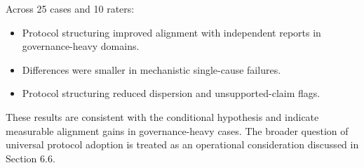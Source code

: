 Across 25 cases and 10 raters:

\begin{itemize}
    \item Protocol structuring improved alignment with independent reports in governance-heavy domains.
    \item Differences were smaller in mechanistic single-cause failures.
    \item Protocol structuring reduced dispersion and unsupported-claim flags.
\end{itemize}

These results are consistent with the conditional hypothesis and indicate measurable alignment gains in governance-heavy cases. The broader question of universal protocol adoption is treated as an operational consideration discussed in Section 6.6.